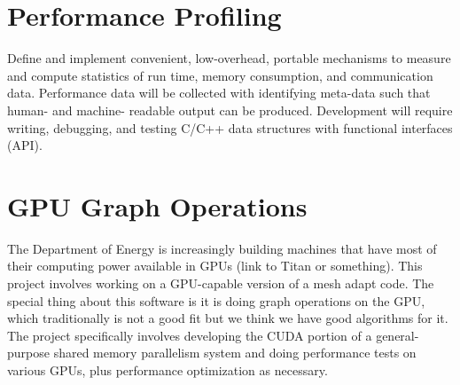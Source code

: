 \documentclass[12pt]{article}
\begin{document}
\section{Performance Profiling}
Define and implement convenient, low-overhead, portable mechanisms to measure
and compute statistics of run time, memory consumption, and communication data.
Performance data will be collected with identifying meta-data such that human-
and machine- readable output can be produced.  Development will require
writing, debugging, and testing C/C++ data structures with functional
interfaces (API).

\section{GPU Graph Operations}
The Department of Energy is increasingly building machines that have most of
their computing power available in GPUs (link to Titan or something). This
project involves working on a GPU-capable version of a mesh adapt
code. The special thing about this software is it is doing graph operations on
the GPU, which traditionally is not a good fit but we think we have good
algorithms for it. The project specifically involves developing the CUDA
portion of a general-purpose shared memory parallelism system and doing
performance tests on various GPUs, plus performance optimization as necessary.
\end{document}
